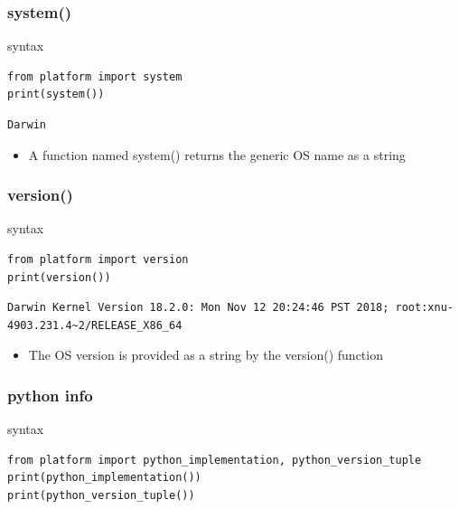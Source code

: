 \documentclass[11pt]{article}
\begin{document}
\subsubsection{system()}
\label{sec:org1801898}
\begin{description}
\item[{syntax}] 
\end{description}
\begin{verbatim}
from platform import system
print(system())
\end{verbatim}

\begin{verbatim}
Darwin
\end{verbatim}

\begin{itemize}
\item A function named system() returns the generic OS name as a string
\end{itemize}

\subsubsection{version()}
\label{sec:org75907a5}
\begin{description}
\item[{syntax}] 
\end{description}
\begin{verbatim}
from platform import version
print(version())
\end{verbatim}

\begin{verbatim}
Darwin Kernel Version 18.2.0: Mon Nov 12 20:24:46 PST 2018; root:xnu-4903.231.4~2/RELEASE_X86_64
\end{verbatim}

\begin{itemize}
\item The OS version is provided as a string by the version() function
\end{itemize}

\subsubsection{python info}
\label{sec:org7559285}
\begin{description}
\item[{syntax}] 
\end{description}
\begin{verbatim}
from platform import python_implementation, python_version_tuple
print(python_implementation())
print(python_version_tuple())
\end{verbatim}
\end{document}
